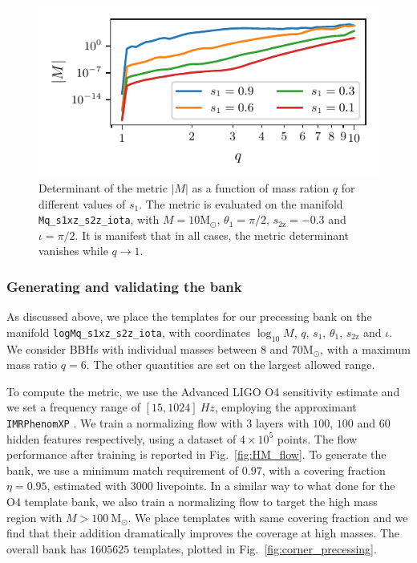 \documentclass[twocolumn,showpacs,preprintnumbers,nofootinbib,prd,
superscriptaddress,10pt]{revtex4-2}
\begin{document}
\begin{figure}[t]
	\centering
	\includegraphics[scale = 1.]{metric_det_vs_q}
	\caption{Determinant of the metric $|M|$ as a function of mass ration $q$ for different values of $s_1$. The metric is evaluated on the manifold \texttt{Mq\_s1xz\_s2z\_iota}, with $M = 10\mathrm{M_\odot}$, $\theta_1 = \pi/2$, $s_\text{2z} = -0.3$ and $\iota = \pi/2$. It is manifest that in all cases, the metric determinant vanishes while $q \to 1$.}
	\label{fig:metric_vs_q}
\end{figure}

\subsubsection{Generating and validating the bank}

As discussed above, we place the templates for our precessing bank on the manifold \texttt{logMq\_s1xz\_s2z\_iota}, with coordinates $\log_{10}M$, $q$, $s_\text{1}$, $\theta_\text{1}$, $s_\text{2z}$ and $\iota$.
We consider BBHs with individual masses between  $8$ and $70 \mathrm{M_\odot}$, with a maximum mass ratio $q = 6$.
The other quantities are set on the largest allowed range.

To compute the metric, we use the Advanced LIGO O4 sensitivity estimate \cite{O4_PSDs} and we set a frequency range of $[15, 1024] \SI{}{Hz}$, employing the approximant \texttt{IMRPhenomXP} \cite{Pratten:2020ceb}.
We train a normalizing flow with $3$ layers with $100$, $100$ and $60$ hidden features respectively, using a dataset of $4\times 10^5$ points.
The flow performance after training is reported in Fig.~\ref{fig:HM_flow}.
To generate the bank, we use a minimum match requirement of $0.97$, with a covering fraction $\eta = 0.95$, estimated with $3000$ livepoints.
In a similar way to what done for the O4 template bank, we also train a normalizing flow to target the high mass region with $M>\SI{100}{\mathrm{M_\odot}}$. We place templates with same covering fraction and we find that their addition dramatically improves the coverage at high masses.
The overall bank has $1605625$ templates, plotted in Fig.~\ref{fig:corner_precessing}.
\end{document}
